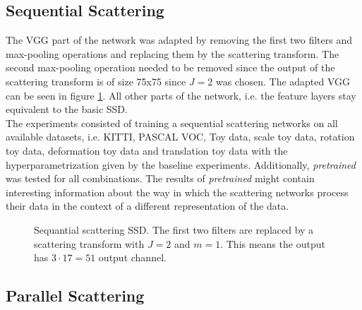 \subsection{Sequential Scattering}
\label{subsec:sequential_scattering_experiment}

The VGG part of the network was adapted by removing the first two filters and max-pooling operations and replacing them by the scattering transform. The second max-pooling operation needed to be removed since the output of the scattering transform is of size 75x75 since $J=2$ was chosen. The adapted VGG can be seen in figure \ref{fig:sequential_scattering_SSD}. All other parts of the network, i.e. the feature layers stay equivalent to the basic SSD. \\
The experiments consisted of training a sequential scattering networks on all available datasets, i.e. KITTI, PASCAL VOC, Toy data, scale toy data, rotation toy data, deformation toy data and translation toy data with the hyperparametrization given by the baseline experiments. Additionally, \textit{pretrained} was tested for all combinations. The results of \textit{pretrained} might contain interesting information about the way in which the scattering networks process their data in the context of a different representation of the data.

\begin{figure}[!htb]
	\centering
	\caption{Sequantial scattering SSD. The first two filters are replaced by a scattering transform with $J=2$ and $m=1$. This means the output has $3 \cdot 17 =51$ output channel.}
	\label{fig:sequential_scattering_SSD}
\end{figure}

\subsection{Parallel Scattering}
\label{subsec:parallel_scattering_experiment}

